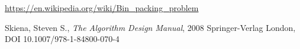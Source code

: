 %
%
%
%
%


\newpage
\begin{thebibliography}{9}

	\url{https://en.wikipedia.org/wiki/Bin_packing_problem}

  Skiena, Steven S., \textit{The Algorithm Design Manual}, 2008 Springer-Verlag
  London, DOI 10.1007/978-1-84800-070-4  
\end{thebibliography}


